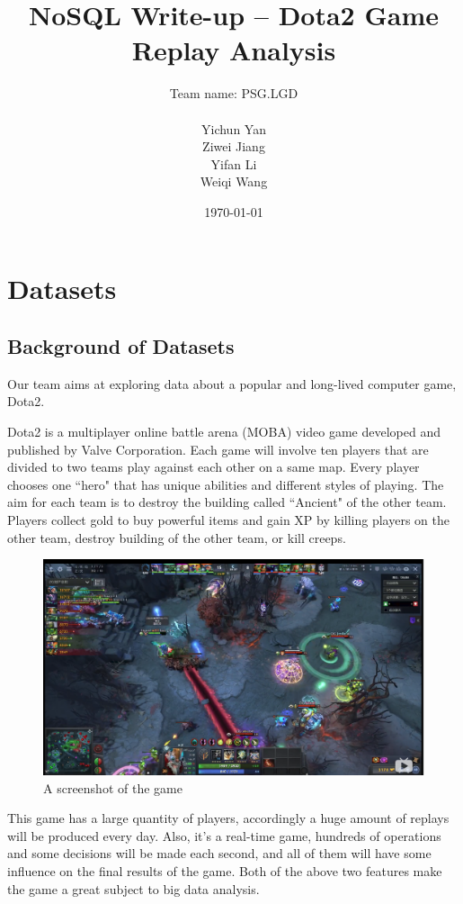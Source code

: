 \documentclass{article}
\title{NoSQL Write-up -- Dota2 Game Replay Analysis}
\author{
    Team name: PSG.LGD \\ \\
    Yichun Yan \\
    Ziwei Jiang \\
    Yifan Li \\
    Weiqi Wang
}
\date{\today}
\begin{document}
\maketitle

\tableofcontents
\clearpage


\section{Datasets}

\subsection{Background of Datasets}

Our team aims at exploring data about a popular and long-lived computer game, Dota2.

Dota2 is a multiplayer online battle arena (\gls{MOBA}) video game developed and published by Valve Corporation. Each game will involve ten players that are divided to two teams play against each other on a same map. Every player chooses one ``hero" that has unique abilities and different styles of playing. The aim for each team is to destroy the building called ``\gls{Ancient}" of the other team. Players collect \gls{gold} to buy powerful items and gain \gls{XP} by killing players on the other team, destroy building of the other team, or kill \gls{creeps}.

\begin{figure}[H]
    \centering
    \includegraphics[width=\linewidth]{pic/combat.png}
    \caption{A screenshot of the game}
\end{figure}

This game has a large quantity of players, accordingly a huge amount of replays will be produced every day. Also, it's a real-time game, hundreds of operations and some decisions will be made each second, and all of them will have some influence on the final results of the game. Both of the above two features make the game a great subject to big data analysis.
\end{document}
